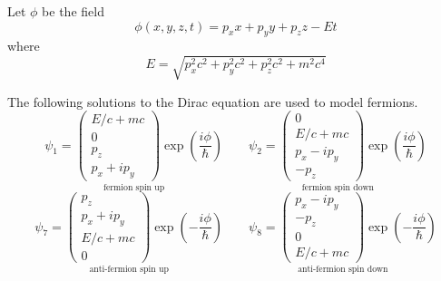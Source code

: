 \documentclass[12pt]{article}
\begin{document}
\noindent
Let $\phi$ be the field
\begin{equation*}
\phi(x,y,z,t)=p_xx+p_yy+p_zz-Et
\end{equation*}
where
\begin{equation*}
E=\sqrt{p_x^2c^2+p_y^2c^2+p_z^2c^2+m^2c^4}
\end{equation*}

\noindent
The following solutions to the Dirac equation are used to model fermions.
\begin{equation*}
\underset{\text{fermion spin up}}
{
\psi_1=\begin{pmatrix}E/c+mc\\0\\p_z\\p_x+ip_y\end{pmatrix}
\exp\left(\frac{i\phi}{\hbar}\right)
}
\qquad
\underset{\text{fermion spin down}}
{
\psi_2=\begin{pmatrix}0\\E/c+mc\\p_x-ip_y\\-p_z\end{pmatrix}
\exp\left(\frac{i\phi}{\hbar}\right)
}
\end{equation*}
\begin{equation*}
\underset{\text{anti-fermion spin up}}
{
\psi_7=\begin{pmatrix}p_z\\p_x+ip_y\\E/c+mc\\0\end{pmatrix}
\exp\left(-\frac{i\phi}{\hbar}\right)
}
\qquad
\underset{\text{anti-fermion spin down}}
{
\psi_8=\begin{pmatrix}p_x-ip_y\\-p_z\\0\\E/c+mc\end{pmatrix}
\exp\left(-\frac{i\phi}{\hbar}\right)
}
\end{equation*}
\end{document}
